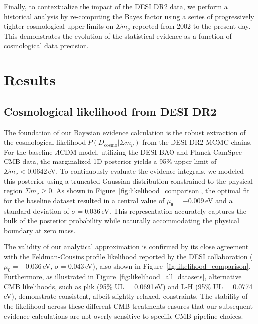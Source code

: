 \documentclass[]{article}
\begin{document}
Finally, to contextualize the impact of the DESI DR2 data, we perform a historical analysis by re-computing the Bayes factor using a series of progressively tighter cosmological upper limits on $\Sigma m_\nu$ reported from 2002 to the present day. This demonstrates the evolution of the statistical evidence as a function of cosmological data precision.

\section{Results}
\label{sec:results}
\subsection{Cosmological likelihood from DESI DR2}
The foundation of our Bayesian evidence calculation is the robust extraction of the cosmological likelihood $P(D_{\text{cosmo}} | \Sigma m_\nu)$ from the DESI DR2 MCMC chains. For the baseline $\Lambda$CDM model, utilizing the DESI BAO and Planck CamSpec CMB data, the marginalized 1D posterior yields a 95\% upper limit of $\Sigma m_\nu < 0.0642$\,eV. To continuously evaluate the evidence integrals, we modeled this posterior using a truncated Gaussian distribution constrained to the physical region $\Sigma m_\nu \geq 0$. As shown in Figure~\ref{fig:likelihood_comparison}, the optimal fit for the baseline dataset resulted in a central value of $\mu_0 = -0.009$\,eV and a standard deviation of $\sigma = 0.036$\,eV. This representation accurately captures the bulk of the posterior probability while naturally accommodating the physical boundary at zero mass.

The validity of our analytical approximation is confirmed by its close agreement with the Feldman-Cousins profile likelihood reported by the DESI collaboration ($\mu_0 = -0.036$\,eV, $\sigma = 0.043$\,eV), also shown in Figure~\ref{fig:likelihood_comparison}. Furthermore, as illustrated in Figure~\ref{fig:likelihood_all_datasets}, alternative CMB likelihoods, such as plik (95\% UL = 0.0691\,eV) and L-H (95\% UL = 0.0774\,eV), demonstrate consistent, albeit slightly relaxed, constraints. The stability of the likelihood across these different CMB treatments ensures that our subsequent evidence calculations are not overly sensitive to specific CMB pipeline choices.
\end{document}
